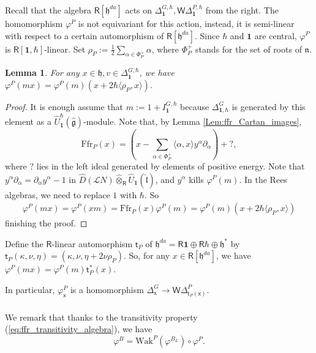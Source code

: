 \documentclass{amsart}
\newtheorem{Lem}[Thm]{Lemma}
\theoremstyle{definition}
\newcommand{\sss}{\subsubsection{}}
\newcommand{\on}{\mathrm}
\newcommand{\Ring}{\mathsf{R}}
\newcommand{\g}{\mathfrak{g}}
\newcommand{\h}{\mathfrak{h}}
\newcommand{\Wak}{\on{Wak}}
\newcommand{\Loop}{\mathscr{L}}
\newcommand{\bone}{\mathbf{1}}
\newcommand{\hl}{\hat{\mathfrak{l}}}
\newcommand{\WakDelta}{\mathsf{W}\Delta}
\newcommand{\sx}{\mathsf{x}}
\newcommand{\Ffr}{\mathrm{{Ffr}}}
\numberwithin{equation}{section}
\begin{document}
\sss\label{SSS_shift} Recall that the algebra $\Ring[\h^{da}]$ acts on  
$\Delta^{G,\hbar}_{\bone}, \WakDelta^{P,\hbar}_{\bone}$ from the right. The homomorphism $\varphi^P$ is not equivariant for this action, instead, it is semi-linear with respect to a certain automorphism of $\Ring[\h^{da}]$. Since $\hbar$ and $\bone$ are central, $\varphi^P$ is $\Ring[\bone,\hbar]$-linear.  
Set $\rho_P:=\frac{1}{2}\sum_{\alpha\in \Phi^+_P}\alpha$, where $\Phi_P^+$ stands for the set of roots of $\mathfrak{n}$.

\begin{Lem}\label{Lem:varphi_right_action}
For any $x\in \h,v\in \Delta^{G,\hbar}_\bone$, 
we have $\varphi^P(mx)=\varphi^P(m)(x+2\hbar\langle\rho_P,x\rangle)$.
\end{Lem}
\begin{proof}
It is enough assume that $m:=1+I^{G,\hbar}_\bone$ because $\Delta^G_{\bone,\hbar}$ is generated by this element as a $\widehat{U}^\hbar_{\bone}(\hat{\g})$-module. Note that, by Lemma \ref{Lem:ffr_Cartan_images}, 
$$\Ffr_P(x)=
(x-\sum_{\alpha\in \Phi^+_P}\langle\alpha,x\rangle y^\alpha \partial_\alpha)+?,$$
where $?$ lies in the left ideal generated by elements of positive energy. Note that $y^\alpha\partial_\alpha=\partial_\alpha y^\alpha-1$ in $\widehat{D}(\Loop N)\widehat{\otimes}_{\Ring}\widehat{U}_{\bone}(\hl)$, and $y^\alpha$ kills $\varphi^P(m)$. In the Rees algebras, we need to replace $1$ with $\hbar$. 
So 
\begin{align*}
\varphi^P(mx)=\varphi^P(xm)=\Ffr_P(x)\varphi^P(m)=\varphi^P(m)(x+2\hbar\langle\rho_P,x\rangle)
\end{align*}
finishing the proof.
\end{proof}

Define the $\Ring$-linear automorphism $\mathsf{t}_P$ of $\h^{da}=\Ring\bone\oplus \Ring\hbar\oplus \h^*$ by 
$\mathsf{t}_P(\kappa,\nu,\eta)=(\kappa,\nu,\eta+2\nu\rho_P)$. So, for any $x\in \Ring[\h^{da}]$, we have $\varphi^P(mx)=\varphi^P(m)\mathsf{t}^*_P(x)$.

In particular, $\varphi^P_{\sx}$ is a homomorphism $\Delta^G_{\sx}\rightarrow \WakDelta^P_{\mathsf{t}_P(\sx)}$.

\sss
We remark that thanks to the transitivity property (\ref{eq:ffr_transitivity_algebra}), we have 
\begin{equation}\label{eq:varphi_transitivity}
\varphi^B=\Wak^P(\varphi^{B_L})\circ \varphi^P.
\end{equation}
\end{document}
